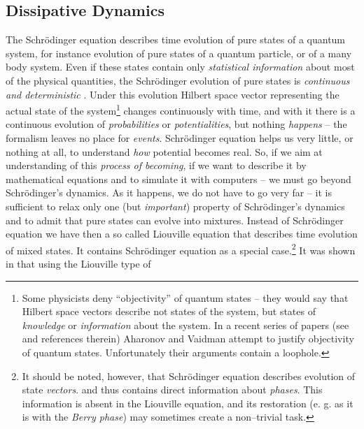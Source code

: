 \documentclass[12pt]{article}
\begin{document}
\subsection{Dissipative Dynamics}

The Schr\"odinger equation describes time evolution of pure states of a quantum
system,  for instance evolution of pure states of a quantum particle, 
 or of a many body system.  
Even if these states
contain only {\sl statistical information} about most of the physical
 quantities,  the
Schr\"odinger evolution of pure states is {\sl continuous and deterministic}
.  Under this evolution Hilbert space vector representing the actual state of
the system\footnote{Some physicists deny ``objectivity'' of quantum states
-- they would say that Hilbert space vectors describe not
states of the system,  but states of {\sl knowledge} or {\sl
information} about  the system.  In a recent series of
papers  (see \cite{aha} and references therein)
Aharonov and Vaidman \cite{aha}
attempt to justify
objectivity of quantum states.  Unfortunately their arguments contain
a loophole. } changes
continuously with time,  and with it there is a continuous evolution of {\sl 
probabilities} or {\sl potentialities},  but nothing {\sl happens} -- the
formalism leaves no place for {\sl events}.  Schr\"odinger equation helps us
very little,  or nothing at all,  to understand {\sl how} potential becomes
real.  So,  if we aim at understanding of this {\sl process of becoming},  if we
want to describe it by mathematical equations and to simulate it with
computers -- we must go beyond Schr\"odinger's dynamics.  As it happens,  we
do not have to go very far -- it is sufficient to relax only one  (but {\sl 
important}) property of Schr\"odinger's dynamics and to admit that pure
states can evolve into mixtures.  Instead of Schr\"odinger equation we have
then a so called Liouville equation that describes time evolution of mixed
states.  It contains Schr\"odinger
equation as a special case.\footnote{
It should be noted,  however,  that Schr\"odinger equation
describes evolution of state {\sl vectors}.  and thus contains direct
information about {\sl phases}.  This information is absent in
the Liouville equation,  and its restoration  (e. g.  as it is with the
{\sl Berry phase}) 
may sometimes create  a non--trivial task. }
It was shown in \cite{bla5} that using the Liouville type of
\end{document}
